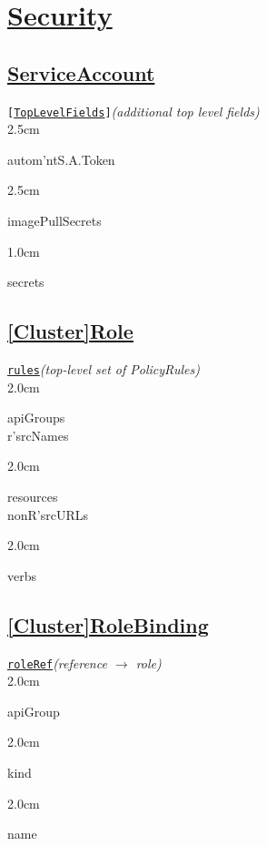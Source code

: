 \section{\href{https://kubernetes.io/docs/reference/access-authn-authz/}{Security}}


\subsection*{\href{https://kubernetes.io/docs/reference/access-authn-authz/authentication/}{ServiceAccount}}

\texttt{[\href{https://kubernetes.io/docs/reference/kubernetes-api/authentication-resources/service-account-v1/}{TopLevelFields}]}\quad\textit{(additional top level fields)}\\[-2mm]
\api
{2.5cm}{
autom'ntS.A.Token       

}
{2.5cm}{
imagePullSecrets

}
{1.0cm}{
secrets     

}
\stopapi



\subsection*{\href{https://kubernetes.io/docs/reference/access-authn-authz/rbac/\#role-and-clusterrole}{[Cluster]Role}}

\texttt{\href{https://kubernetes.io/docs/reference/kubernetes-api/authorization-resources/cluster-role-v1/}{rules}}\quad\textit{(top-level set of PolicyRules)}\\[-2mm]
\api
{2.0cm}{
apiGroups       \\
r'srcNames      

}
{2.0cm}{
resources       \\
nonR'srcURLs    

}
{2.0cm}{
verbs           

}
\stopapi




\subsection*{\href{https://kubernetes.io/docs/reference/access-authn-authz/rbac/\#rolebinding-and-clusterrolebinding}{[Cluster]RoleBinding}}

\texttt{\href{https://kubernetes.io/docs/reference/kubernetes-api/authorization-resources/role-binding-v1/}{roleRef}}\quad\textit{(reference $\to$ role)}\\[-2mm]
\api
{2.0cm}{
apiGroup

}
{2.0cm}{
kind

}
{2.0cm}{
name

}
\stopapi

